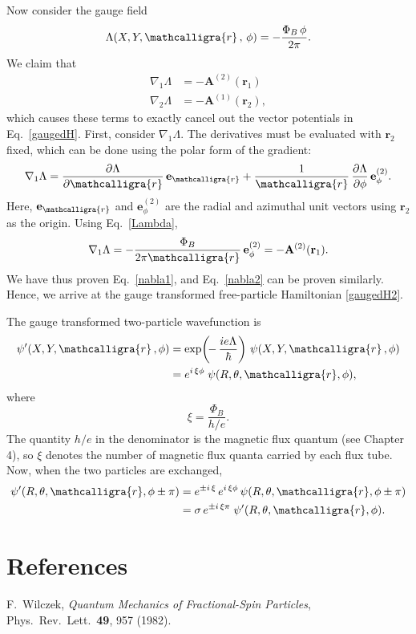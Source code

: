 \documentclass[pra,12pt]{revtex4}
\begin{document}
Now consider the gauge field
\begin{equation}
  \Lambda(X, Y, \mathcalligra{r}\,,\, \phi) = -\frac{\Phi_B \,\phi}{2\pi}.
  \label{Lambda}
\end{equation}
We claim that
\begin{align}
  \nabla_1 \Lambda &= - \mathbf{A}^{(2)}(\mathbf{r}_1) \label{nabla1} \\
  \nabla_2 \Lambda &= - \mathbf{A}^{(1)}(\mathbf{r}_2), \label{nabla2}
\end{align}
which causes these terms to exactly cancel out the vector potentials
in Eq.~\eqref{gaugedH}.  First, consider $\nabla_1\Lambda$.  The
derivatives must be evaluated with $\mathbf{r}_2$ fixed, which can be
done using the polar form of the gradient:
\begin{equation}
  \nabla_1\Lambda =  \frac{\partial
    \Lambda}{\partial \mathcalligra{r}} \, \mathbf{e}_{\mathcalligra{r}}
  + \frac{1}{\mathcalligra{r}} \,\frac{\partial \Lambda}{\partial \phi}
  \, \mathbf{e}^{(2)}_{\phi}.
\end{equation}
Here, $\mathbf{e}_{\mathcalligra{r}}$ and $\mathbf{e}^{(2)}_{\phi}$
are the radial and azimuthal unit vectors using $\mathbf{r}_2$ as the
origin.  Using Eq.~\eqref{Lambda},
\begin{equation}
  \nabla_1\Lambda = - \frac{\Phi_B}{2\pi\mathcalligra{r}} \,
  \mathbf{e}^{(2)}_{\phi} = - \mathbf{A}^{(2)}(\mathbf{r}_1).
\end{equation}
We have thus proven Eq.~\eqref{nabla1}, and Eq.~\eqref{nabla2} can be
proven similarly.  Hence, we arrive at the gauge transformed
free-particle Hamiltonian \eqref{gaugedH2}.

The gauge transformed two-particle wavefunction is
\begin{align}
  \begin{aligned}
  \psi'(X, Y, \mathcalligra{r}\,, \phi)
  &= \exp\!\left(\!-\,\frac{ie\Lambda}{\hbar}\right)\,
  \psi(X, Y, \mathcalligra{r}\,, \phi) \\
  &= e^{i \, \xi \phi}\; \psi(R, \theta, \mathcalligra{r}, \phi),
  \end{aligned}
\end{align}
where
\begin{equation}
  \xi = \frac{\Phi_B}{h/e}.
\end{equation}
The quantity $h/e$ in the denominator is the magnetic flux quantum
(see Chapter 4), so $\xi$ denotes the number of magnetic flux quanta
carried by each flux tube.  Now, when the two particles are exchanged,
\begin{align}
  \psi'(R, \theta, \mathcalligra{r}, \phi \pm \pi) &=
  e^{\pm i \, \xi} \,
  e^{i \, \xi \phi}\,
  \psi(R, \theta, \mathcalligra{r}, \phi \pm \pi) \\
  &= \sigma \,e^{\pm i \, \xi\pi}\;
  \psi'(R, \theta, \mathcalligra{r}, \phi).
\end{align}




\section*{References}

\begin{enumerate}[[1{]}]
\item F.~Wilczek, \textit{Quantum Mechanics of Fractional-Spin Particles},
  Phys.~Rev.~Lett.~\textbf{49}, 957 (1982).
  \label{cite:wilczek}
\end{enumerate}
\end{document}

